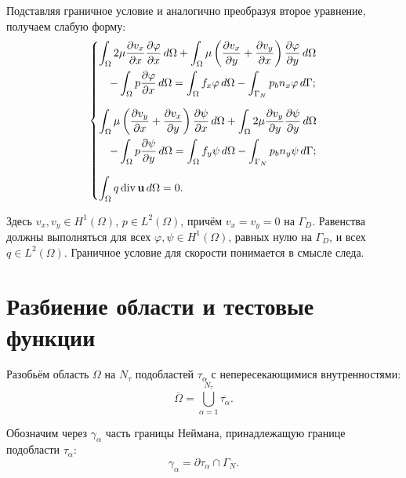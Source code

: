 \documentclass[a4paper,14pt]{extarticle}
\begin{document}
Подставляя граничное условие и аналогично преобразуя
второе уравнение, получаем слабую форму:
\begin{equation}
	\begin{dcases}
		\int_\Omega
		2\mu
		\frac{\partial v_x}{\partial x}
		\frac{\partial\varphi}{\partial x}\,d\Omega
		+
		\int_\Omega
		\mu\left(
			\frac{\partial v_x}{\partial y}
			+
			\frac{\partial v_y}{\partial x}
		\right)
		\frac{\partial\varphi}{\partial y}\,d\Omega
		\\
		\quad
		-
		\int_\Omega
		p\frac{\partial\varphi}{\partial x}\,d\Omega
		=
		\int_\Omega f_x\varphi\,d\Omega
		-
		\int_{\Gamma_N}
		p_b n_x\varphi\,d\Gamma;
		\\[6pt]
		\int_\Omega
		\mu\left(
			\frac{\partial v_y}{\partial x}
			+
			\frac{\partial v_x}{\partial y}
		\right)
		\frac{\partial\psi}{\partial x}\,d\Omega
		+
		\int_\Omega
		2\mu
		\frac{\partial v_y}{\partial y}
		\frac{\partial\psi}{\partial y}\,d\Omega
		\\
		\quad
		-
		\int_\Omega
		p\frac{\partial\psi}{\partial y}\,d\Omega
		=
		\int_\Omega f_y\psi\,d\Omega
		-
		\int_{\Gamma_N}
		p_b n_y\psi\,d\Gamma;
		\\[6pt]
		\int_\Omega
		q\operatorname{div}\mathbf u\,d\Omega=0.
	\end{dcases}
	\label{eq:weak}
\end{equation}

Здесь $v_x,v_y\in H^1(\Omega)$, $p\in L^2(\Omega)$,
причём $v_x=v_y=0$ на $\Gamma_D$. Равенства должны
выполняться для всех $\varphi,\psi\in H^1(\Omega)$,
равных нулю на $\Gamma_D$, и всех $q\in L^2(\Omega)$.
Граничное условие для скорости понимается в смысле следа.

\section{Разбиение области и тестовые функции}

Разобьём область $\Omega$ на $N_\tau$ подобластей
$\tau_\alpha$ с непересекающимися внутренностями:
\begin{equation}
	\overline{\Omega}
	=
	\bigcup_{\alpha=1}^{N_\tau}
	\overline{\tau_\alpha}.
\end{equation}

Обозначим через $\gamma_\alpha$ часть границы Неймана,
принадлежащую границе подобласти $\tau_\alpha$:
\begin{equation}
	\gamma_\alpha
	=
	\partial\tau_\alpha \cap \Gamma_N.
\end{equation}
\end{document}
